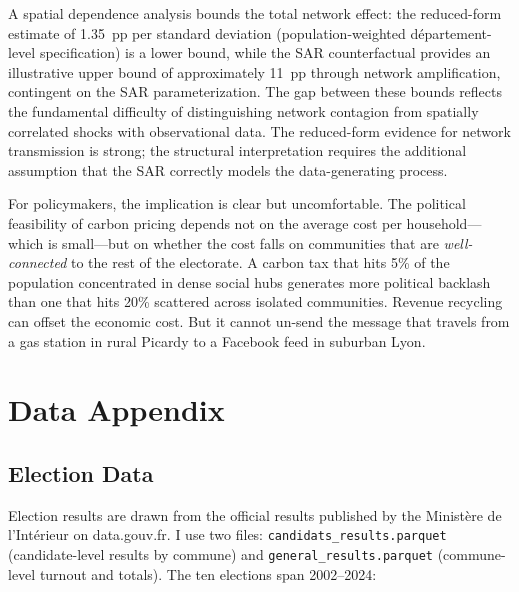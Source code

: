 \documentclass[12pt]{article}
\newcommand{\dept}{d\'{e}partement}
\begin{document}
A spatial dependence analysis bounds the total network effect: the reduced-form estimate of 1.35~pp per standard deviation (population-weighted \dept{}-level specification) is a lower bound, while the SAR counterfactual provides an illustrative upper bound of approximately 11~pp through network amplification, contingent on the SAR parameterization. The gap between these bounds reflects the fundamental difficulty of distinguishing network contagion from spatially correlated shocks with observational data. The reduced-form evidence for network transmission is strong; the structural interpretation requires the additional assumption that the SAR correctly models the data-generating process.

For policymakers, the implication is clear but uncomfortable. The political feasibility of carbon pricing depends not on the average cost per household---which is small---but on whether the cost falls on communities that are \emph{well-connected} to the rest of the electorate. A carbon tax that hits 5\% of the population concentrated in dense social hubs generates more political backlash than one that hits 20\% scattered across isolated communities. Revenue recycling can offset the economic cost. But it cannot un-send the message that travels from a gas station in rural Picardy to a Facebook feed in suburban Lyon.

\label{apep_main_text_end}






\clearpage
\appendix
\setcounter{table}{0}
\renewcommand{\thetable}{A\arabic{table}}
\setcounter{figure}{0}
\renewcommand{\thefigure}{A\arabic{figure}}

\section{Data Appendix}
\label{app:data}

\subsection{Election Data}

Election results are drawn from the official results published by the Minist\`{e}re de l'Int\'{e}rieur on data.gouv.fr. I use two files: \texttt{candidats\_results.parquet} (candidate-level results by commune) and \texttt{general\_results.parquet} (commune-level turnout and totals). The ten elections span 2002--2024:
\end{document}
